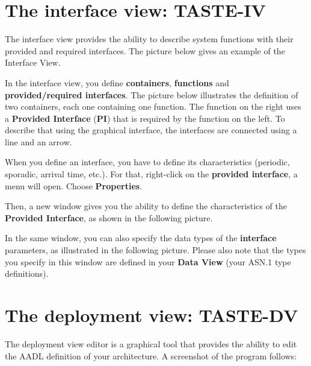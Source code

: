\documentclass[11pt]{book}
\newcommand{\Concept}[1]{#1\xspace}
\newcommand{\aadl}{\Concept{AADL}}
\begin{document}
   \section{The interface view: TASTE-IV}
   The interface view provides the ability to describe system functions with
   their provided and required interfaces. The picture below gives an example of
   the Interface View.

   \centerline{}

   In the interface view, you define \textbf{containers}, \textbf{functions} and
   \textbf{provided/required interfaces}. The picture below illustrates the
   definition of two containers, each one containing one function. The function on
   the right uses a \textbf{Provided Interface} (\textbf{PI}) that is required
   by the function on the left. To describe that using the graphical interface,
   the interfaces are connected using a line and an arrow.

   \centerline{}

   When you define an interface, you have to define its characteristics
   (periodic, sporadic, arrival time, etc.). For that, right-click on the
   \textbf{provided interface}, a menu will open. Choose \textbf{Properties}.

   \centerline{}

   Then, a new window gives you the ability to define the characteristics of the
   \textbf{Provided Interface}, as shown in the following picture.

   \centerline{}

   In the same window, you can also specify the data types of the \textbf{interface} 
   parameters, as illustrated in the following picture. Please also note that the types you
   specify in this window are defined in your \textbf{Data View} (your ASN.1 type definitions).

   \centerline{}

   \section{The deployment view: TASTE-DV}

   The deployment view editor is a graphical tool that provides the ability to
   edit the \aadl definition of your architecture. A screenshot of the program follows: 
\end{document}
